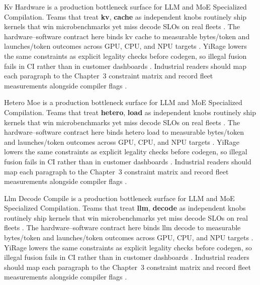 Kv Hardware is a production bottleneck surface for LLM and MoE Specialized Compilation. Teams that treat \textbf{kv}, \textbf{cache} as independent knobs routinely ship kernels that win microbenchmarks yet miss decode SLOs on real fleets \citep{memoryfloor2026,amd2024xdna}. The hardware--software contract here binds kv cache to measurable bytes/token and launches/token outcomes across GPU, CPU, and NPU targets \citep{nvidia2022hopper,amd2024aie}. YiRage lowers the same constraints as explicit legality checks before codegen, so illegal fusion fails in CI rather than in customer dashboards \citep{semianalysis2024tma,dlbook}. Industrial readers should map each paragraph to the Chapter~3 constraint matrix and record fleet measurements alongside compiler flags \citep{amd2024xdna,dao2022flashattention}.

Hetero Moe is a production bottleneck surface for LLM and MoE Specialized Compilation. Teams that treat \textbf{hetero}, \textbf{load} as independent knobs routinely ship kernels that win microbenchmarks yet miss decode SLOs on real fleets \citep{nvidia2022hopper,amd2024aie}. The hardware--software contract here binds hetero load to measurable bytes/token and launches/token outcomes across GPU, CPU, and NPU targets \citep{semianalysis2024tma,dlbook}. YiRage lowers the same constraints as explicit legality checks before codegen, so illegal fusion fails in CI rather than in customer dashboards \citep{amd2024xdna,dao2022flashattention}. Industrial readers should map each paragraph to the Chapter~3 constraint matrix and record fleet measurements alongside compiler flags \citep{amd2024aie,kwon2023vllm}.

Llm Decode Compile is a production bottleneck surface for LLM and MoE Specialized Compilation. Teams that treat \textbf{llm}, \textbf{decode} as independent knobs routinely ship kernels that win microbenchmarks yet miss decode SLOs on real fleets \citep{semianalysis2024tma,dlbook}. The hardware--software contract here binds llm decode to measurable bytes/token and launches/token outcomes across GPU, CPU, and NPU targets \citep{amd2024xdna,dao2022flashattention}. YiRage lowers the same constraints as explicit legality checks before codegen, so illegal fusion fails in CI rather than in customer dashboards \citep{amd2024aie,kwon2023vllm}. Industrial readers should map each paragraph to the Chapter~3 constraint matrix and record fleet measurements alongside compiler flags \citep{dlbook,nvidia2024cudagraphs}.

